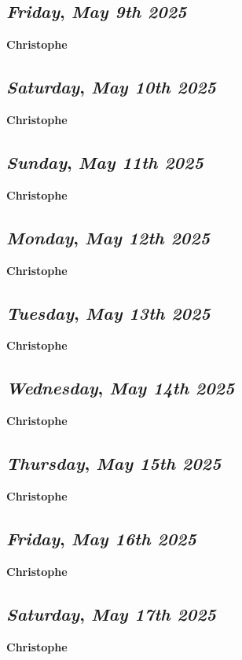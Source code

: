 \def\day{\textit{May 9th 2025}}
\def\weekday{\textit{Friday}}
\subsection*{\weekday, \day}
\textbf {Christophe}

\def\day{\textit{May 10th 2025}}
\def\weekday{\textit{Saturday}}
\subsection*{\weekday, \day}
\textbf {Christophe}

\def\day{\textit{May 11th 2025}}
\def\weekday{\textit{Sunday}}
\subsection*{\weekday, \day}
\textbf {Christophe}

\def\day{\textit{May 12th 2025}}
\def\weekday{\textit{Monday}}
\subsection*{\weekday, \day}
\textbf {Christophe}

\def\day{\textit{May 13th 2025}}
\def\weekday{\textit{Tuesday}}
\subsection*{\weekday, \day}
\textbf {Christophe}

\def\day{\textit{May 14th 2025}}
\def\weekday{\textit{Wednesday}}
\subsection*{\weekday, \day}
\textbf {Christophe}

\def\day{\textit{May 15th 2025}}
\def\weekday{\textit{Thursday}}
\subsection*{\weekday, \day}
\textbf {Christophe}

\def\day{\textit{May 16th 2025}}
\def\weekday{\textit{Friday}}
\subsection*{\weekday, \day}
\textbf {Christophe}

\def\day{\textit{May 17th 2025}}
\def\weekday{\textit{Saturday}}
\subsection*{\weekday, \day}
\textbf {Christophe}

